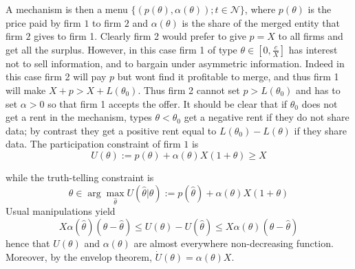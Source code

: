 \documentclass[a4paper]{article}
\newcommand{\N}{\mathcal N}
\renewcommand{\th}{\hat\theta}
\renewcommand{\t}{\theta}
\renewcommand{\a}{\alpha}
\begin{document}
A mechanism is then a menu $\{(p(\t),\a(\t));t\in \N\}$, where $p(\t)$ is the price paid by firm $1$ to firm $2$ and $\a(\t)$ is the share of the merged entity that firm $2$ gives to firm 1. Clearly firm 2 would prefer to give $p=X$ to all firms and get all the surplus. However, in this case firm 1 of type $\t\in[0,\frac{c}{X}]$ has interest not to sell information, and to bargain under asymmetric information. Indeed in this case firm 2 will pay $p$ but wont find it profitable to merge, and thus firm 1 will make $X+p>X+L(\t_0)$. Thus firm 2 cannot set $p>L(\t_0)$ and has to set $\a >0$ so that firm 1 accepts the offer. It should be clear that if $\t_0$ does not get a rent in the mechanism, types $\t<\t_0$ get a negative rent if they do not share data; by contrast they get a positive rent equal to $L(\t_0)-L(\t)$ if they share data. The participation constraint of firm $1$ is
\begin{equation}
  U(\t):=p(\t)+\a(\t)X(1+\t)\geq X 
\end{equation}

while the truth-telling constraint is
\begin{equation*}
  \t \in \arg\max_{\th} U(\th|\t):=p(\th)+\a(\t)X(1+\t)
\end{equation*}
%
Usual manipulations yield 
%
\[
  X \a(\th)(\t-\th)\leq U(\t)-U(\th)\leq X\a(\t)(\t-\th)
\]
%
hence that $U(\t)$ and $\a(\t)$ are almost everywhere non-decreasing function. Moreover, by the envelop theorem, $\dot U(\theta)=\a(\t)X$. 
\end{document}
